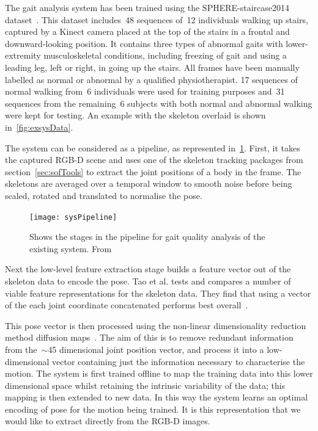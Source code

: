 \documentclass[11pt]{article} %
\begin{document}
The gait analysis system has been trained using the SPHERE-staircase2014 dataset~\cite{Paiement}. This dataset includes~48 sequences of~12 individuals walking up stairs, captured by a Kinect camera placed at the top of the stairs in a frontal and downward-looking position. It contains three types of abnormal gaits with lower-extremity musculoskeletal conditions, including freezing of gait and using a leading leg, left or right, in going up the stairs. All frames have been manually labelled as normal or abnormal by a qualified physiotherapist. 17 sequences of normal walking from~6 individuals were used for training purposes and~31 sequences from the remaining~6 subjects with both normal and abnormal walking were kept for testing. An example with the skeleton overlaid is shown in~\ref{fig:exsysData}.


The system can be considered as a pipeline, as represented in~\ref{fig:sysPipe}. First, it takes the captured RGB-D scene and uses one of the skeleton tracking packages from section~\ref{sec:sofTools} to extract the joint positions of a body in the frame. The skeletons are averaged over a temporal window to smooth noise before being scaled, rotated and translated to normalise the pose.  
\begin{figure}
\texttt{[image: sysPipeline]}
\caption{Shows the stages in the pipeline for gait quality analysis of the existing system. From~\cite{Tao}		\label{fig:sysPipe}  }
\end{figure}

Next the low-level feature extraction stage builds a feature vector out of the skeleton data to encode the pose. Tao et al. tests and compares a number of viable feature representations for the skeleton data. They find that using a vector of the each joint coordinate concatenated performs best overall~\cite{Tao}. 

This pose vector is then processed using the non-linear dimensionality reduction method diffusion maps~\cite{Coifman2006}. The aim of this is to remove redundant information from the~$\sim$45 dimensional joint position vector, and process it into a low-dimensional vector containing just the information necessary to characterise the motion. The system is first trained offline to map the training data into this lower dimensional space whilst retaining the intrinsic variability of the data; this mapping is then extended to new data. In this way the system learns an optimal encoding of pose for the motion being trained. It is this representation that we would like to extract directly from the RGB-D images.
\end{document}
